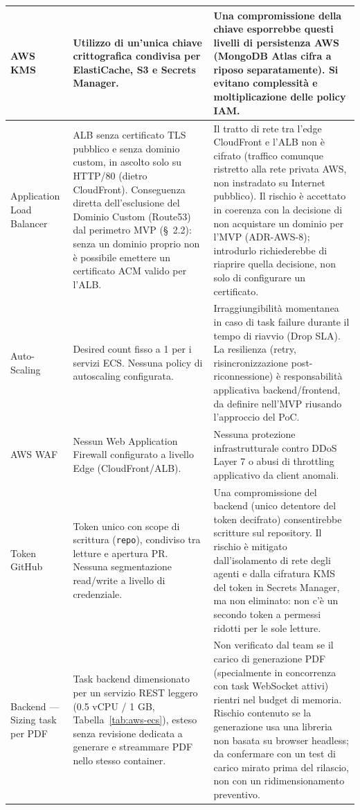 \documentclass[11pt,a4paper]{article}
\begin{document}
\begin{center}
\begin{xltabular}{\textwidth}{|X|X|X|}
AWS KMS & Utilizzo di un'unica chiave crittografica condivisa per ElastiCache, S3 e Secrets Manager. & Una compromissione della chiave esporrebbe questi livelli di persistenza AWS (MongoDB Atlas cifra a riposo separatamente). Si evitano complessità e moltiplicazione delle policy IAM. \\ \hline
Application Load Balancer & ALB senza certificato TLS pubblico e senza dominio custom, in ascolto solo su HTTP/80 (dietro CloudFront). Conseguenza diretta dell'esclusione del Dominio Custom (Route53) dal perimetro MVP (\S~2.2): senza un dominio proprio non è possibile emettere un certificato ACM valido per l'ALB. & Il tratto di rete tra l'edge CloudFront e l'ALB non è cifrato (traffico comunque ristretto alla rete privata AWS, non instradato su Internet pubblico). Il rischio è accettato in coerenza con la decisione di non acquistare un dominio per l'MVP (ADR-AWS-8); introdurlo richiederebbe di riaprire quella decisione, non solo di configurare un certificato. \\ \hline
Auto-Scaling & Desired count fisso a 1 per i servizi ECS. Nessuna policy di autoscaling configurata. & Irraggiungibilità momentanea in caso di task failure durante il tempo di riavvio (Drop SLA). La resilienza (retry, risincronizzazione post-riconnessione) è responsabilità applicativa backend/frontend, da definire nell'MVP riusando l'approccio del PoC. \\ \hline
AWS WAF & Nessun Web Application Firewall configurato a livello Edge (CloudFront/ALB). & Nessuna protezione infrastrutturale contro DDoS Layer 7 o abusi di throttling applicativo da client anomali. \\ \hline
Token GitHub & Token unico con scope di scrittura (\texttt{repo}), condiviso tra letture e apertura PR. Nessuna segmentazione read/write a livello di credenziale. & Una compromissione del backend (unico detentore del token decifrato) consentirebbe scritture sul repository. Il rischio è mitigato dall'isolamento di rete degli agenti e dalla cifratura KMS del token in Secrets Manager, ma non eliminato: non c'è un secondo token a permessi ridotti per le sole letture. \\ \hline
Backend --- Sizing task per PDF & Task backend dimensionato per un servizio REST leggero (0.5 vCPU / 1 GB, Tabella~\ref{tab:aws-ecs}), esteso senza revisione dedicata a generare e streammare PDF nello stesso container. & Non verificato dal team se il carico di generazione PDF (specialmente in concorrenza con task WebSocket attivi) rientri nel budget di memoria. Rischio contenuto se la generazione usa una libreria non basata su browser headless; da confermare con un test di carico mirato prima del rilascio, non con un ridimensionamento preventivo. \\ \hline
\end{xltabular}
\end{center}
\end{document}

